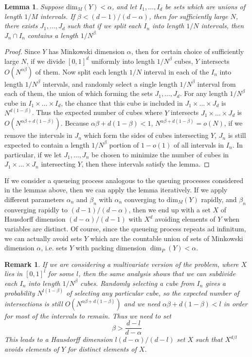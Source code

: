\documentclass{report}
\theoremstyle{plain}
\newtheorem{lemma}{Lemma}
\theoremstyle{plain}
\newtheorem*{remark}{Remark}
\begin{document}
\begin{lemma}
    Suppose $\text{dim}_M(Y) < \alpha$, and let $I_1, \dots, I_d$ be sets which are unions of length $1/M$ intervals. If $\beta < (d - 1)/(d - \alpha)$, then for sufficiently large $N$, there exists $J_1, \dots, J_d$ such that if we split each $I_n$ into length $1/N$ intervals, then $J_n \cap I_n$ contains a length $1/N^\beta$
\end{lemma}
\begin{proof}
    Since $Y$ has Minkowski dimension $\alpha$, then for certain choice of sufficiently large $N$, if we divide $[0,1]^d$ uniformly into length $1/N^\beta$ cubes, $Y$ intersects $O(N^{\alpha \beta})$ of them. Now split each length $1/N$ interval in each of the $I_n$ into length $1/N^\beta$ intervals, and randomly select a single length $1/N^\beta$ interval from each of them, the union of which forming the sets $J_1, \dots, J_d$. For any length $1/N^\beta$ cube in $I_1 \times \dots \times I_d$, the chance that this cube is included in $J_1 \times \dots \times J_d$ is $N^{d(1-\beta)}$. Thus the expected number of cubes where $Y$ intersects $J_1 \times \dots \times J_d$ is $O(N^{\alpha \beta + d(1-\beta)})$. Because $\alpha \beta + d (1 - \beta) < 1$, $N^{\alpha \beta + d(1 - \beta)} = o(N)$, if we remove the intervals in $J_n$ which form the sides of cubes intersecting $Y$, $J_n$ is still expected to contain a length $1/N^\beta$ portion of $1 - o(1)$ of all intervals in $I_n$. In particular, if we let $J_1, \dots, J_n$ be chosen to minimize the number of cubes in $J_1 \times \dots \times J_n$ intersecting $Y$, then these intervals satisfy the lemma.
\end{proof}

If we consider a queueing process analogous to the queuing processes considered in the lemmas above, then we can apply the lemma iteratively. If we apply different parameters $\alpha_n$ and $\beta_n$ with $\alpha_n$ converging to $\text{dim}_M(Y)$ rapidly, and $\beta_n$ converging rapidly to $(d - 1)/(d-\alpha)$, then we end up with a set $X$ of Hausdorff dimension $(d - \alpha)/(d-1)$ with $X^d$ avoiding elements of $Y$ when variables are distinct. Of course, since the queueing process repeats ad infinitum, we can actually avoid sets $Y$ which are the countable union of sets of Minkowski dimension $\alpha$, i.e. sets $Y$ with packing dimension $\dim_P(Y) < \alpha$.

\begin{remark}
    If we are considering a multivariate version of the problem, where $X$ lies in $[0,1]^l$ for some $l$, then the same analysis shows that we can subdivide each $I_n$ into length $1/N^\beta$ cubes. Randomly selecting a cube from $I_n$ gives a probability $N^{l(1-\beta)}$ of selecting any particular cube, so the expected number of intersections is still $O(N^{\alpha \beta + d(1 - \beta)})$ and we need $\alpha \beta + d(1 - \beta) < l$ in order for most of the intervals to remain. Thus we need to set
    \[ \beta > \frac{d - l}{d - \alpha} \]
    This leads to a Hausdorff dimension $l(d - \alpha)/(d-l)$ set $X$ such that $X^{d/l}$ avoids elements of $Y$ for distinct elements of $X$.
\end{remark}
\end{document}
